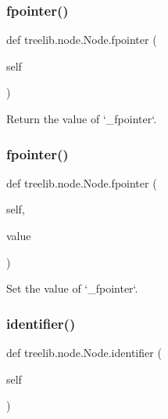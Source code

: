 \subsubsection{\texorpdfstring{fpointer()}{fpointer()}\hspace{0.1cm}{\footnotesize\ttfamily [1/2]}}
{\footnotesize\ttfamily def treelib.\+node.\+Node.\+fpointer (\begin{DoxyParamCaption}\item[{}]{self }\end{DoxyParamCaption})}

\begin{DoxyVerb}Return the value of `_fpointer`.\end{DoxyVerb}
 \mbox{\label{classtreelib_1_1node_1_1Node_acb2cb3505fd3c75bd6cd06712a03641c}} 
\subsubsection{\texorpdfstring{fpointer()}{fpointer()}\hspace{0.1cm}{\footnotesize\ttfamily [2/2]}}
{\footnotesize\ttfamily def treelib.\+node.\+Node.\+fpointer (\begin{DoxyParamCaption}\item[{}]{self,  }\item[{}]{value }\end{DoxyParamCaption})}

\begin{DoxyVerb}Set the value of `_fpointer`.\end{DoxyVerb}
 \mbox{\label{classtreelib_1_1node_1_1Node_a6dbeb05446904d2febeaa4d20abb31a1}} 
\subsubsection{\texorpdfstring{identifier()}{identifier()}\hspace{0.1cm}{\footnotesize\ttfamily [1/2]}}
{\footnotesize\ttfamily def treelib.\+node.\+Node.\+identifier (\begin{DoxyParamCaption}\item[{}]{self }\end{DoxyParamCaption})}

